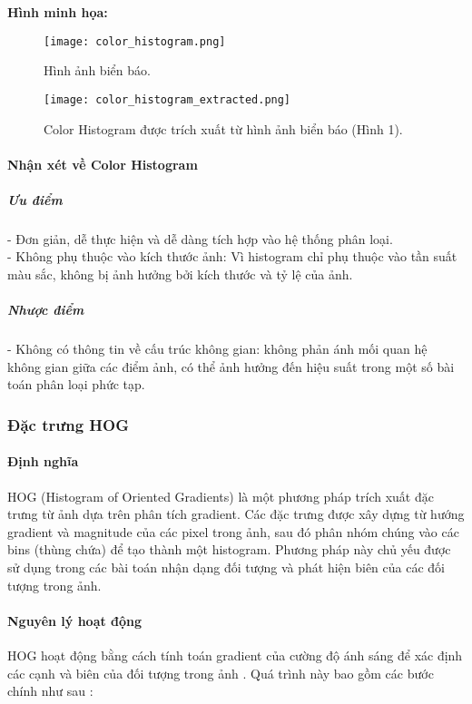 \documentclass[a4paper,12pt]{article}
\begin{document}
\vspace{0.5cm}

\noindent
\textbf{Hình minh họa:}
\begin{figure}[H]
    \centering
    \texttt{[image: color\_histogram.png]}
    \caption{Hình ảnh biển báo.}
    \vspace{0.5cm}
    \texttt{[image: color\_histogram\_extracted.png]}
    \caption{Color Histogram được trích xuất từ hình ảnh biển báo (Hình 1).}
    \label{fig:color_histogram}
\end{figure}

\paragraph{Nhận xét về Color Histogram}

\subparagraph{Ưu điểm}
- Đơn giản, dễ thực hiện và dễ dàng tích hợp vào hệ thống phân loại.\\
- Không phụ thuộc vào kích thước ảnh: Vì histogram chỉ phụ thuộc vào tần suất màu sắc, không bị ảnh hưởng bởi kích thước và tỷ lệ của ảnh.\\

\subparagraph{Nhược điểm}
- Không có thông tin về cấu trúc không gian: không phản ánh mối quan hệ không gian giữa các điểm ảnh, có thể ảnh hưởng đến hiệu suất trong một số bài toán phân loại phức tạp.\\

\subsubsection{Đặc trưng HOG}

\paragraph{Định nghĩa}
\hspace{5mm}HOG (Histogram of Oriented Gradients) là một phương pháp trích xuất đặc trưng từ ảnh dựa trên phân tích gradient. Các đặc trưng được xây dựng từ hướng gradient và magnitude của các pixel trong ảnh, sau đó phân nhóm chúng vào các bins (thùng chứa) để tạo thành một histogram. Phương pháp này chủ yếu được sử dụng trong các bài toán nhận dạng đối tượng và phát hiện biên của các đối tượng trong ảnh.

\paragraph{Nguyên lý hoạt động}
\hspace{5mm}HOG hoạt động bằng cách tính toán gradient của cường độ ánh sáng để xác định các cạnh và biên của đối tượng trong ảnh . Quá trình này bao gồm các bước chính như sau \cite{hog_opencv}:
\end{document}
